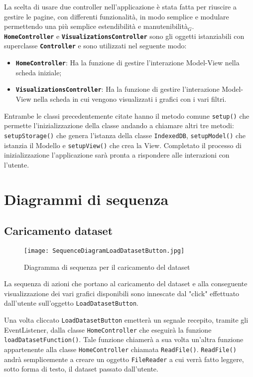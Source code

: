 La scelta di usare due controller nell'applicazione è stata fatta per riuscire a gestire le pagine, con differenti funzionalità, in modo semplice e modulare permettendo una più semplice estendibilità e manutenibilità$_G$.\\
\textbf{\texttt{HomeController}} e \textbf{\texttt{VisualizationsController}} sono gli oggetti istanziabili con superclasse \textbf{\texttt{Controller}} e sono utilizzati nel seguente modo:
\begin{itemize}
	\item \textbf{\texttt{HomeController}}: Ha la funzione di gestire l'interazione Model-View nella scheda iniziale;
	\item \textbf{\texttt{VisualizationsController}}: Ha la funzione di gestire l'interazione Model-View nella scheda in cui vengono visualizzati i grafici con i vari filtri.
\end{itemize}
Entrambe le classi precedentemente citate hanno il metodo comune \texttt{setup()} che permette l'inizializzazione della classe andando a chiamare altri tre metodi: \texttt{setupStorage()} che genera l'istanza della classe \texttt{IndexedDB}, \texttt{setupModel()} che istanzia il Modello e \texttt{setupView()} che crea la View. Completato il processo di inizializzazione l'applicazione sarà pronta a rispondere alle interazioni con l'utente.

\section{Diagrammi di sequenza}
\subsection{Caricamento dataset}
\begin{figure}[H]
	\centering
	\texttt{[image: SequenceDiagramLoadDatasetButton.jpg]}
	\caption{Diagramma di sequenza per il caricamento del dataset}
  \end{figure}
  La sequenza di azioni che portano al caricamento del dataset e alla conseguente visualizzazione dei vari grafici disponibili sono innescate dal "click" effettuato dall'utente sull'oggetto \texttt{LoadDatasetButton}.

Una volta cliccato \texttt{LoadDatasetButton} emetterà un segnale recepito, tramite gli EventListener, dalla classe \texttt{HomeController} che eseguirà la funzione\\ \texttt{loadDatasetFunction()}. Tale funzione chiamerà a sua volta un'altra funzione appartenente alla classe \texttt{HomeController} chiamata \texttt{ReadFile()}.
\texttt{ReadFile()} andrà semplicemente a creare un oggetto \texttt{FileReader} a cui verrà fatto leggere, sotto forma di testo, il dataset passato dall'utente.

